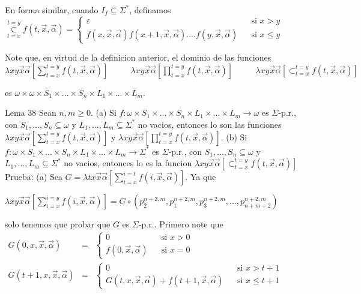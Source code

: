 En forma similar, cuando \(I_{f}\subseteq \Sigma ^{\ast }\), definamos
\(\displaystyle \overset{t=y}{\underset{t=x}{\subset }}f(t,\vec{x},\vec{\alpha})=\left\{ \begin{array}{lll} \varepsilon & & \text{si }x >y \\ f(x,\vec{x},\vec{\alpha})f(x+1,\vec{x},\vec{\alpha})....f(y,\vec{x},\vec{ \alpha}) & & \text{si }x\leq y \end{array} \right. \)

Note que, en virtud de la definicion anterior, el dominio de las funciones
\(\displaystyle \lambda xy\vec{x}\vec{\alpha}\left[ \sum_{t=x}^{t=y}f(t,\vec{x},\vec{\alpha}) \right] \ \ \ \ \ \ \ \ \ \ \ \ \lambda xy\vec{x}\vec{\alpha}\left[ \prod_{t=x}^{t=y}f(t,\vec{x},\vec{\alpha})\right] \ \ \ \ \ \ \ \ \ \ \ \ \lambda xy\vec{x}\vec{\alpha}\left[ \subset _{t=x}^{t=y}f(t,\vec{x},\vec{ \alpha})\right] \)

es \(\omega \times \omega \times S_{1}\times ...\times S_{n}\times L_{1}\times ...\times L_{m}\).


Lema 38 Sean \(n,m\geq 0\).
(a) Si \(f:\omega \times S_{1}\times ...\times S_{n}\times L_{1}\times ...\times L_{m}\rightarrow \omega \) es \(\Sigma \)-p.r., con \( S_{1},...,S_{n}\subseteq \omega \) y \(L_{1},...,L_{m}\subseteq \Sigma ^{\ast } \) no vacios, entonces lo son las funciones \(\lambda xy\vec{x}\vec{\alpha} \left[ \sum_{t=x}^{t=y}f(t,\vec{x},\vec{\alpha})\right] \) y \(\lambda xy\vec{x }\vec{\alpha}\left[ \prod_{t=x}^{t=y}f(t,\vec{x},\vec{\alpha})\right] \).
(b) Si \(f:\omega \times S_{1}\times ...\times S_{n}\times L_{1}\times ...\times L_{m}\rightarrow \Sigma ^{\ast }\) es \(\Sigma \)-p.r., con \( S_{1},...,S_{n}\subseteq \omega \) y \(L_{1},...,L_{m}\subseteq \Sigma ^{\ast } \) no vacios, entonces lo es la funcion \(\lambda xy\vec{x}\vec{\alpha}\left[ \subset _{t=x}^{t=y}f(t,\vec{x},\vec{\alpha})\right] \)
Prueba: (a) Sea \(G=\lambda tx\vec{x}\vec{\alpha}\left[ \sum_{i=x}^{i=t}f(i,\vec{x}, \vec{\alpha})\right] \). Ya que

\(\displaystyle \lambda xy\vec{x}\vec{\alpha}\left[ \sum_{i=x}^{i=y}f(i,\vec{x},\vec{\alpha}) \right] =G\circ \left( p_{2}^{n+2,m},p_{1}^{n+2,m},p_{3}^{n+2,m},...,p_{n+m+2}^{n+2,m}\right) \)

solo tenemos que probar que \(G\) es \(\Sigma \)-p.r.. Primero note que
\(\displaystyle \begin{array}{rcl} G(0,x,\vec{x},\vec{\alpha}) & =& \left\{ \begin{array}{lll} 0 & & \text{si }x >0 \\ f(0,\vec{x},\vec{\alpha}) & & \text{si }x=0 \end{array} \right. \\ G(t+1,x,\vec{x},\vec{\alpha}) & =& \left\{ \begin{array}{lll} 0 & & \text{si }x >t+1 \\ G(t,x,\vec{x},\vec{\alpha})+f(t+1,\vec{x},\vec{\alpha}) & & \text{si }x\leq t+1 \end{array} \right. \end{array} \)

